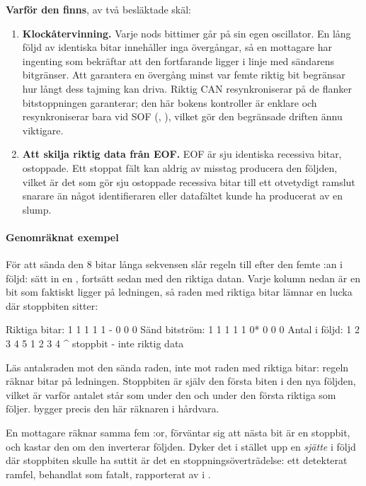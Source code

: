 \textbf{Varför den finns}, av två besläktade skäl:
\begin{enumerate}
  \item \textbf{Klockåtervinning.} Varje nods bittimer går på sin egen oscillator. En lång följd av
    identiska bitar innehåller inga övergångar, så en mottagare har ingenting som bekräftar att den
    fortfarande ligger i linje med sändarens bitgränser. Att garantera en övergång minst var femte
    riktig bit begränsar hur långt dess tajming kan driva. Riktig CAN resynkroniserar på de flanker
    bitstoppningen garanterar; den här bokens kontroller är enklare och resynkroniserar bara vid SOF
    (, ), vilket gör den begränsade driften ännu viktigare.
  \item \textbf{Att skilja riktig data från EOF.} EOF är sju identiska recessiva bitar, ostoppade.
    Ett stoppat fält kan aldrig av misstag producera den följden, vilket är det som gör sju
    ostoppade recessiva bitar till ett otvetydigt ramslut snarare än något identifieraren eller
    datafältet kunde ha producerat av en slump.
\end{enumerate}

\paragraph{Genomräknat exempel}
För att sända den 8 bitar långa sekvensen  slår regeln till efter den femte
:an i följd: sätt in en , fortsätt sedan med den riktiga datan. Varje kolumn nedan
är en bit som faktiskt ligger på ledningen, så raden med riktiga bitar lämnar en lucka där
stoppbiten sitter:

\begin{textdrawing}
Riktiga bitar:            1  1  1  1  1  -  0  0  0
Sänd bitström:            1  1  1  1  1  0* 0  0  0
Antal i följd:            1  2  3  4  5  1  2  3  4
                                         ^ stoppbit - inte riktig data
\end{textdrawing}

Läs antalsraden mot den sända raden, inte mot raden med riktiga bitar: regeln räknar bitar på
ledningen. Stoppbiten är själv den första biten i den nya följden, vilket är varför antalet står som
 under den och  under den första riktiga  som följer.  bygger
precis den här räknaren i hårdvara.

En mottagare räknar samma fem :or, förväntar sig att nästa bit är en stoppbit, och kastar
den om den inverterar följden. Dyker det i stället upp en \emph{sjätte}  i följd där
stoppbiten skulle ha suttit är det en stoppningsöverträdelse: ett detekterat ramfel, behandlat som
fatalt, rapporterat av  i .

